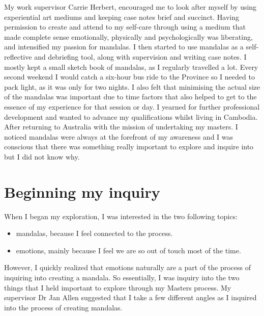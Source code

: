 My work supervisor Carrie Herbert, encouraged me to look after myself by using experiential art mediums and keeping case notes brief and succinct. Having permission to create and attend to my self-care through using a medium that made complete sense emotionally, physically and psychologically was liberating, and intensified my passion for mandalas. I then started to use mandalas as a self-reflective and debriefing tool, along with supervision and writing case notes. I mostly kept a small sketch book of mandalas, as I regularly travelled a lot. Every second weekend I would catch a six-hour bus ride to the Province so I needed to pack light, as it was only for two nights. I also felt that minimising the actual size of the mandalas was important due to time factors that also helped to get to the essence of my experience for that session or day.
I yearned for further professional development and wanted to advance my qualifications whilst living in Cambodia. After returning to Australia with the mission of undertaking my masters. I noticed mandalas were always at the forefront of my awareness and I was conscious that there was something really important to explore and inquire into but I did not know why.

\section{Beginning my inquiry}

When I began my exploration, I was interested in the two following topics:
\begin{itemize}
\item mandalas, because I feel connected to the process. 
\end{itemize}

\begin{itemize}
\item emotions, mainly because I feel we are so out of touch most of the time. 
\end{itemize}

However, I quickly realized that emotions naturally are a part of the process of inquiring into creating a mandala. So essentially, I was inquiry into the two things that I held important to explore through my Masters process.  
My supervisor Dr Jan Allen suggested that I take a few different angles as I inquired into the process of creating mandalas.

\newpage

